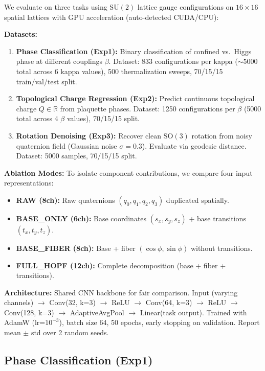 \documentclass[10pt,twocolumn]{article}
\newcommand{\SU}{\mathrm{SU}}
\newcommand{\SO}{\mathrm{SO}}
\newcommand{\RR}{\mathbb{R}}
\begin{document}
We evaluate on three tasks using $\SU(2)$ lattice gauge configurations on $16 \times 16$ spatial lattices with GPU acceleration (auto-detected CUDA/CPU):

\textbf{Datasets:}
\begin{enumerate}
\item \textbf{Phase Classification (Exp1):} Binary classification of confined vs.\ Higgs phase at different couplings $\beta$. Dataset: 833 configurations per kappa (${\sim}5000$ total across 6 kappa values), 500 thermalization sweeps, 70/15/15 train/val/test split.
\item \textbf{Topological Charge Regression (Exp2):} Predict continuous topological charge $Q \in \RR$ from plaquette phases. Dataset: 1250 configurations per $\beta$ (5000 total across 4 $\beta$ values), 70/15/15 split.
\item \textbf{Rotation Denoising (Exp3):} Recover clean $\SO(3)$ rotation from noisy quaternion field (Gaussian noise $\sigma=0.3$). Evaluate via geodesic distance. Dataset: 5000 samples, 70/15/15 split.
\end{enumerate}

\textbf{Ablation Modes:} To isolate component contributions, we compare four input representations:
\begin{itemize}
\item \textbf{RAW (8ch):} Raw quaternions $(q_0, q_1, q_2, q_3)$ duplicated spatially.
\item \textbf{BASE\_ONLY (6ch):} Base coordinates $(s_x, s_y, s_z)$ + base transitions $(t_x, t_y, t_z)$.
\item \textbf{BASE\_FIBER (8ch):} Base + fiber $(\cos\phi, \sin\phi)$ without transitions.
\item \textbf{FULL\_HOPF (12ch):} Complete decomposition (base + fiber + transitions).
\end{itemize}

\textbf{Architecture:} Shared CNN backbone for fair comparison. Input (varying channels) $\to$ Conv(32, k=3) $\to$ ReLU $\to$ Conv(64, k=3) $\to$ ReLU $\to$ Conv(128, k=3) $\to$ AdaptiveAvgPool $\to$ Linear(task output). Trained with AdamW (lr=$10^{-3}$), batch size 64, 50 epochs, early stopping on validation. Report mean $\pm$ std over 2 random seeds.

\subsection{Phase Classification (Exp1)}
\end{document}

